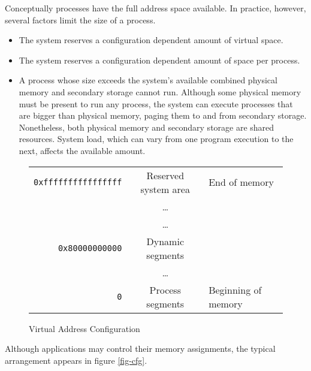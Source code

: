 Conceptually processes have the full address space available.
In practice, however, several factors limit the size of a process.
\begin{itemize}
  \item The system reserves a configuration dependent amount of virtual space.
  \item The system reserves a configuration dependent amount of space per
    process.
  \item
    A process whose size exceeds the system's available combined physical
    memory and secondary storage cannot run. Although some physical memory
    must be present to run any process, the system can execute processes that
    are bigger than physical memory, paging them to and from secondary storage.
    Nonetheless, both physical memory and secondary storage are
    shared resources. System load, which can vary from one program execution
    to the next, affects the available amount.
\end{itemize}

\begin{figure}[H]
\Hrule
  \caption{Virtual Address Configuration}
  \label{fig-address}
  \begin{center}
    \begin{tabular}{r|c|l}
      \noalign{\smallskip}  \cline{2-2}
      \verb|0xffffffffffffffff| & Reserved system area & End of memory\\
      & \dots & \\ \cline{2-2}
      & \dots & \\
      \verb|0x80000000000| & Dynamic segments & \\ \cline{2-2}
      & \dots & \\
      \verb|0| & Process segments & Beginning of memory\\ \cline{2-2}
    \end{tabular}
  \end{center}
\Hrule
\end{figure}

Although applications may control their memory assignments, the typical
arrangement appears in figure \ref{fig-cfg}.

